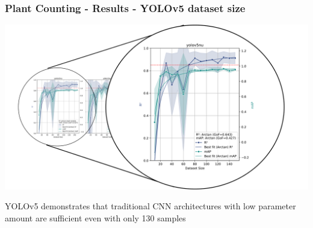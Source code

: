 \documentclass[aspectratio=43]{beamer}
\begin{document}
\begin{frame}
    \frametitle{Plant Counting - Results - YOLOv5 dataset size}
    
    \begin{center}
        \includegraphics[width=1\textwidth]{Imgs/r2_ap_vs_dataset_size_yolov5_2.pdf}
    \end{center}
    
    YOLOv5 demonstrates that traditional CNN architectures with low parameter amount are sufficient even with only 130 samples

\end{frame}
\end{document}
